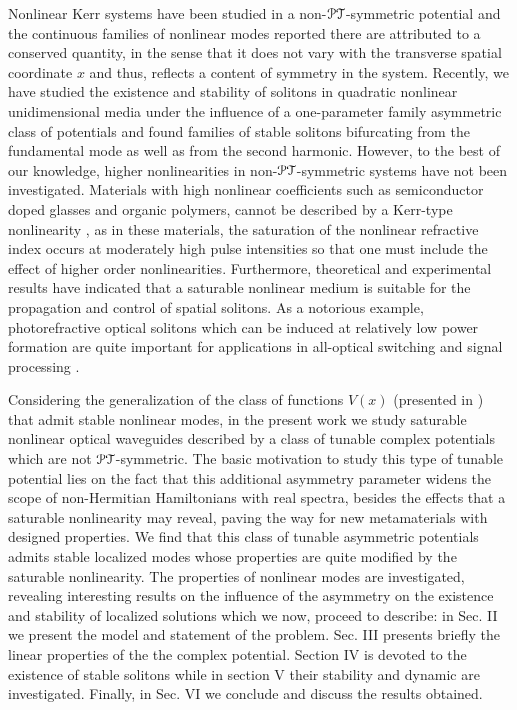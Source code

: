 \documentclass[aps,pre,showpacs,twocolumn]{revtex4}
\newcommand{\PT}{{\cal PT}}
\begin{document}
Nonlinear Kerr systems have been studied in a non-$\PT$-symmetric 
potential and the continuous families of nonlinear modes reported 
there are attributed to a conserved quantity, in the sense that it 
does not vary with the transverse spatial coordinate $x$ \cite{npt_solitons} and thus, reflects a content of 
symmetry in the system. Recently, we have studied the existence and stability of solitons in quadratic nonlinear unidimensional media 
under the influence of a one-parameter family asymmetric class of potentials \cite{Yang2016} and found families of stable solitons \cite{moreira16} bifurcating from the fundamental mode as well as 
from the second harmonic. However, to the best of our knowledge, higher nonlinearities in non-$\PT$-symmetric systems have
not been investigated. Materials with high nonlinear coefficients 
such as semiconductor doped glasses and organic polymers, cannot be described by a Kerr-type nonlinearity \cite{gatz}, as in these 
materials, the saturation of the nonlinear refractive index occurs at moderately high pulse 
intensities so that one must include the effect of higher order nonlinearities. Furthermore, theoretical and experimental results have indicated that a saturable nonlinear medium is suitable for the propagation and control of spatial solitons. As a notorious example, photorefractive optical solitons which can be induced at relatively low power formation are quite important for applications in all-optical switching and signal processing \cite{Segev}. 

 Considering the generalization of the class of functions $V(x)$ 
 (presented in \cite{Yang2016}) that 
 admit stable nonlinear modes, in the present work we study saturable nonlinear optical waveguides described by a class of tunable complex potentials which are not $\PT$-symmetric. The basic motivation to study 
 this type of tunable
 potential lies on the fact that this additional asymmetry parameter
 widens the scope of non-Hermitian Hamiltonians with real spectra,
 besides the effects that a saturable nonlinearity may reveal, 
 paving the way for new metamaterials with designed properties. 
 We find that this class of tunable asymmetric potentials 
 admits stable localized modes whose properties are quite modified by 
 the saturable nonlinearity. The properties of nonlinear modes are investigated, revealing interesting results on the influence of the
 asymmetry on the existence and stability of localized solutions which 
 we now, proceed to describe: in Sec. II we present the model and 
 statement of the problem. Sec. III presents briefly the linear 
 properties of the the  complex potential. Section IV is devoted to the existence of stable solitons while in section V their stability and dynamic are investigated. Finally, in Sec. VI we  conclude and 
 discuss the results obtained. 
 
\end{document}
